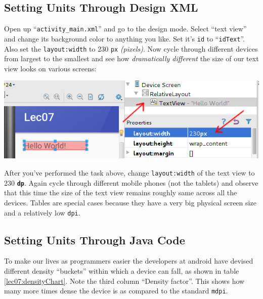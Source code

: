 \subsection{Setting Units Through Design XML}
\label{ITS:unitXML}
Open up ``\texttt{activity\_main.xml}'' and go to the design mode. Select ``text view'' and change its background color to anything you like. Set it's \texttt{id} to ``\texttt{idText}''. Also set the \texttt{layout:width} to 230 \texttt{px} \textit{(pixels)}. Now cycle through different devices from largest to the smallest and see how \textit{dramatically different} the size of our text view looks on various screens:
\begin{center}
	\includegraphics[scale=0.4]{chapters/ch06/images/3}
\end{center} 

After you've performed the task above, change \texttt{layout:width} of the text view to 230 \texttt{\textbf{dp}}. Again cycle through different mobile phones (not the tablets) and observe that this time the size of the text view remains roughly same across all the devices. Tables are special cases because they have a very big physical screen size and a relatively low \texttt{dpi}.

\subsection{Setting Units Through Java Code}
\label{ITS:unitJavaCode}
To make our lives as programmers easier the developers at android have devised different density ``buckets'' within which a device can fall, as shown in table \ref{lec07:densityChart}. Note the third column ``Density factor''. This shows how many more times dense the device is as compared to the standard \texttt{mdpi}. \\


